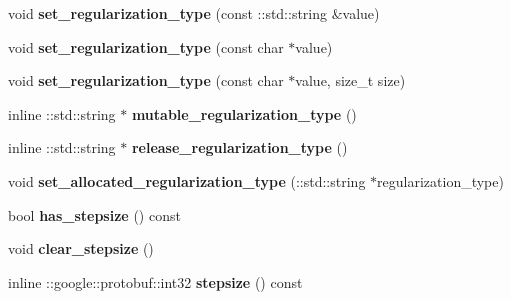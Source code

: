 \begin{DoxyCompactItemize}
\mbox{\label{classcaffe_1_1_solver_parameter_ac57efc981ddbd0f51a072210e581cabf}} 
void {\bfseries set\+\_\+regularization\+\_\+type} (const \+::std\+::string \&value)
\item 
\mbox{\label{classcaffe_1_1_solver_parameter_a5c0057176d7757d7fd65a9529df3872e}} 
void {\bfseries set\+\_\+regularization\+\_\+type} (const char $\ast$value)
\item 
\mbox{\label{classcaffe_1_1_solver_parameter_ab7fa9e90219cfb54415c6553f4c7e87e}} 
void {\bfseries set\+\_\+regularization\+\_\+type} (const char $\ast$value, size\+\_\+t size)
\item 
\mbox{\label{classcaffe_1_1_solver_parameter_a4a5c4167eaf30e38cf33577aaccde002}} 
inline \+::std\+::string $\ast$ {\bfseries mutable\+\_\+regularization\+\_\+type} ()
\item 
\mbox{\label{classcaffe_1_1_solver_parameter_a948bf8799df58e30dca5124c859d0eef}} 
inline \+::std\+::string $\ast$ {\bfseries release\+\_\+regularization\+\_\+type} ()
\item 
\mbox{\label{classcaffe_1_1_solver_parameter_a4ac3509465977400abb06dd83c7c898e}} 
void {\bfseries set\+\_\+allocated\+\_\+regularization\+\_\+type} (\+::std\+::string $\ast$regularization\+\_\+type)
\item 
\mbox{\label{classcaffe_1_1_solver_parameter_a129f5e6c3b5dccec61f7d1381e0a44e8}} 
bool {\bfseries has\+\_\+stepsize} () const
\item 
\mbox{\label{classcaffe_1_1_solver_parameter_a8164e59be6b5cd54c332eae92252402f}} 
void {\bfseries clear\+\_\+stepsize} ()
\item 
\mbox{\label{classcaffe_1_1_solver_parameter_a117bb74105b2449eef188e4222e076d6}} 
inline \+::google\+::protobuf\+::int32 {\bfseries stepsize} () const
\item 
\mbox{\label{classcaffe_1_1_solver_parameter_a3afaa4869c82d940a43d7cd5005d7271}} 

\end{DoxyCompactItemize}

